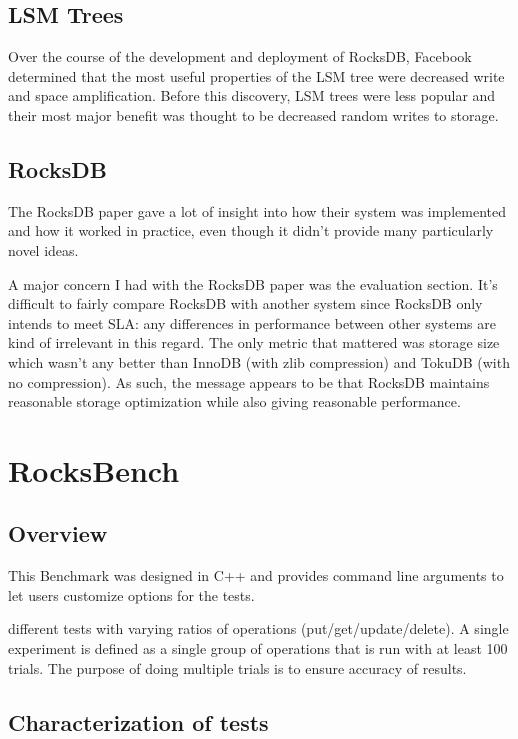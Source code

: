 \documentclass[twocolumn,11pt]{article}
\begin{document}
\subsection{LSM Trees}

Over the course of the development and deployment of RocksDB, Facebook
determined that the most useful properties of the LSM tree were decreased write
and space amplification. Before this discovery, LSM trees were less popular and
their most major benefit was thought to be decreased random writes to storage.

\subsection{RocksDB}

The RocksDB paper gave a lot of insight into how their system was implemented
and how it worked in practice, even though it didn't provide many particularly
novel ideas.

A major concern I had with the RocksDB paper was the evaluation section. It's
difficult to fairly compare RocksDB with another system since RocksDB only
intends to meet SLA: any differences in performance between other systems are
kind of irrelevant in this regard. The only metric that mattered was storage
size which wasn't any better than InnoDB (with zlib compression) and TokuDB
(with no compression). As such, the message appears to be that RocksDB maintains
reasonable storage optimization while also giving reasonable performance.

\section{RocksBench}

\subsection{Overview}

This Benchmark was designed in C++ and provides command line arguments to let
users customize options for the tests.

different tests with varying ratios of operations (put/get/update/delete). A
single experiment is defined as a single group of operations that is run with at
least 100 trials. The purpose of doing multiple trials is to ensure accuracy of
results.

\subsection{Characterization of tests}
\label{subsec:characterization_tests}
\end{document}
